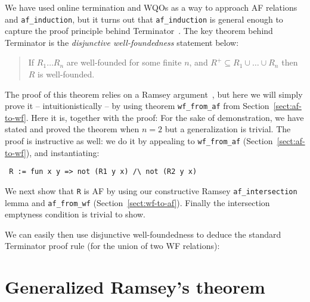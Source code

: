 \documentclass{llncs}
\begin{document}
We have used online termination and WQOs as a way to approach AF relations and 
\lstinline|af_induction|, but it turns out that \lstinline|af_induction| is general 
enough to capture the proof principle behind Terminator~\cite{terminator,podelski-rybalchenko:transition}.
The key theorem behind Terminator is the {\em disjunctive well-foundedness} statement below:
\begin{quote} If $R_1\ldots R_n$ are well-founded for some finite $n$, 
              and $R^{+} \subseteq R_1 \cup \ldots \cup R_n$ then $R$ is well-founded.
\end{quote}
The proof of this theorem relies on a Ramsey argument~\cite{podelski-rybalchenko:transition}, 
but here we will simply prove it -- intuitionistically -- by using theorem \lstinline|wf_from_af| 
from Section~\ref{sect:af-to-wf}. Here it is, together with the proof: 
For the sake of demonstration, we have stated and proved the theorem 
when $n = 2$ but a generalization is trivial. The proof is instructive as well: we do it
by appealing to \lstinline|wf_from_af| (Section~\ref{sect:af-to-wf}), and instantiating: 
\begin{center}
\lstinline| R := fun x y => not (R1 y x) /\ not (R2 y x)| 
\end{center} 
We next show that \lstinline|R| is AF by using our constructive Ramsey \lstinline|af_intersection| 
lemma and \lstinline|af_from_wf| (Section~\ref{sect:wf-to-af}). Finally the intersection emptyness 
condition is trivial to show. 

We can easily then use disjunctive well-foundedness to deduce the standard Terminator proof rule (for 
the union of two WF relations): 
\begin{center}
\end{center}

\section{Generalized Ramsey's theorem}\label{sect:generalized-irt}
\end{document}
